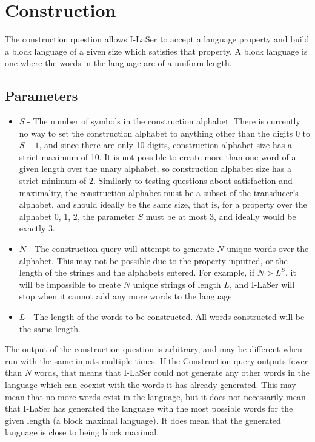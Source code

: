 \documentclass{article}
\begin{document}
\section{Construction}
The construction question allows I-LaSer to accept a language property and build a block language of a given size which satisfies that property.\cite{Construction}
A block language is one where the words in the language are of a uniform length.
\subsection{Parameters}
\begin{itemize}
\item $S$ - The number of symbols in the construction alphabet. There is currently no way to set the construction alphabet to anything other than the digits 0 to $S-1$, and since there are only 10 digits, construction alphabet size has a strict maximum of 10.
It is not possible to create more than one word of a given length over the unary alphabet, so construction alphabet size has a strict minimum of 2.
Similarly to testing questions about satisfaction and maximality, the construction alphabet must be a subset of the transducer's alphabet, and should ideally be the same size, that is, for a property over the alphabet {0, 1, 2}, the parameter $S$ must be at most 3, and ideally would be exactly 3.
\item $N$ - The construction query will attempt to generate $N$ unique words over the alphabet.
This may not be possible due to the property inputted, or the length of the strings and the alphabets entered.
For example, if $N > L^S$, it will be impossible to create $N$ unique strings of length $L$, and I-LaSer will stop when it cannot add any more words to the language.
\item $L$ - The length of the words to be constructed. All words constructed will be the same length. 
\end{itemize}
The output of the construction question is arbitrary, and may be different when run with the same inputs multiple times.
If the Construction query outputs fewer than $N$ words, that means that I-LaSer could not generate any other words in the language which can coexist with the words it has already generated.
This may mean that no more words exist in the language, but it does not necessarily mean that I-LaSer has generated the language with the most possible words for the given length (a block maximal language).
It does mean that the generated language is close to being block maximal.
\end{document}
